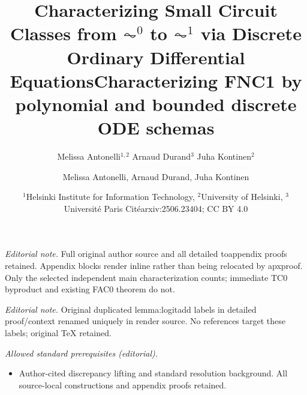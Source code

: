 \documentclass[11pt, oneside]{article}
\title{Characterizing Small Circuit Classes from $\AC^0$ to $\AC^1$ via Discrete Ordinary Differential Equations}
\author{Melissa Antonelli$^{1,2}$ \quad Arnaud Durand$^3$ \quad Juha Kontinen$^2$}
\date{\small{$^1$Helsinki Institute for Information Technology, $^2$University of Helsinki, $^3$Universit\'e Paris Cit\'e}}
\title{Characterizing FNC1 by polynomial and bounded discrete ODE schemas}
\author{Melissa Antonelli, Arnaud Durand, Juha Kontinen}
\date{arxiv:2506.23404; CC BY 4.0}
\theoremstyle{definition}
\begin{document}
\maketitle
\noindent\textit{Editorial note.} Full original author source and all detailed toappendix proofs retained. Appendix blocks render inline rather than being relocated by apxproof. Only the selected independent main characterization counts; immediate TC0 byproduct and existing FAC0 theorem do not.\par\medskip
\noindent\textit{Editorial note.} Original duplicated lemma:logitadd labels in detailed proof/context renamed uniquely in render source. No references target these labels; original TeX retained.\par\medskip
\noindent\textit{Allowed standard prerequisites (editorial).}\begin{itemize}
\item Author-cited discrepancy lifting and standard resolution background. All source-local constructions and appendix proofs retained.
\end{itemize}\medskip

\maketitle
\end{document}
